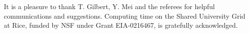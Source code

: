 \documentclass{ws-ijbc}
\begin{document}
 \noindent
It is a pleasure to thank T. Gilbert, Y. Mei and the referees
  for helpful communications and suggestions.
Computing time on the Shared University Grid at Rice,
  funded by NSF under Grant EIA-0216467, is gratefully acknowledged.







%
%
%
\end{document}
